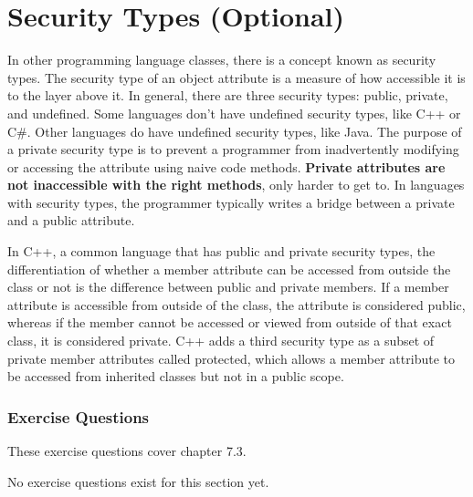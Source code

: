 \section{Security Types (Optional)}
In other programming language classes, there is a concept known as security types. The security type of an object attribute is a measure of how accessible it is to the layer above it. In general, there are three security types: public, private, and undefined. Some languages don't have undefined security types, like C++ or C\#. Other languages do have undefined security types, like Java. The purpose of a private security type is to prevent a programmer from inadvertently modifying or accessing the attribute using naive code methods. \textbf{Private attributes are not inaccessible with the right methods}, only harder to get to. In languages with security types, the programmer typically writes a bridge between a private and a public attribute.\par
In C++, a common language that has public and private security types, the differentiation of whether a member attribute can be accessed from outside the class or not is the difference between public and private members. If a member attribute is accessible from outside of the class, the attribute is considered public, whereas if the member cannot be accessed or viewed from outside of that exact class, it is considered private. C++ adds a third security type as a subset of private member attributes called protected, which allows a member attribute to be accessed from inherited classes but not in a public scope.\par
\subsubsection*{Exercise Questions}
These exercise questions cover chapter 7.3.

No exercise questions exist for this section yet.
